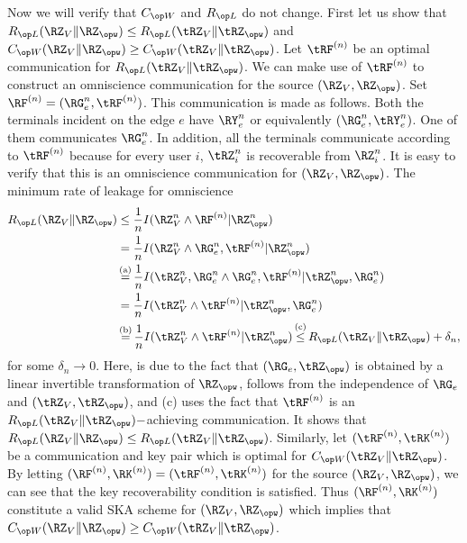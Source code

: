 Now we will verify that $\wskc$ and $\rl$ do not change.  First let us show that $\rl(\RZ_V\|\RZ_{\opw}) \leq \rl(\tRZ_V\|\tRZ_{\opw})$ and $\wskc(\RZ_V\| \RZ_{\opw}) \geq \wskc(\tRZ_V\|\tRZ_{\opw})$.
Let $\tRF^{(n)}$  be  an optimal communication  for $\rl(\tRZ_V\|\tRZ_{\opw})$. We can make use of $\tRF^{(n)}$ to construct an omniscience communication for the source $(\RZ_V,\RZ_{\opw})$. Set  $\RF^{(n)}= (\RG_e^n, \tRF^{(n)})$. This communication is made as follows. Both the terminals incident on the edge $e$  have $\RY_e^n$ or equivalently $(\RG_e^n, \tRY_e^n)$. One of them  communicates $\RG_e^n$. In addition, all the terminals communicate according to $\tRF^{(n)}$ because for every user $i$,  $\tRZ_i^n$ is recoverable from $\RZ_i^n$. It is easy to verify that this is an omniscience communication for $(\RZ_V,\RZ_{\opw})$.
The minimum rate of leakage for omniscience 
\begin{align*}
\rl(\RZ_V\|\RZ_{\opw})&\leq \frac{1}{n}I(\RZ_V^n\wedge  \RF^{(n)}|\RZ_{\opw}^n)\\ &= \frac{1}{n}I(\RZ_V^n\wedge  \RG_e^n, \tRF^{(n)}|\RZ_{\opw}^n)\\
&\utag{a}= \frac{1}{n}I(\tRZ_V^n,\RG_e^n\wedge  \RG_e^n, \tRF^{(n)}|\tRZ_{\opw}^n, \RG_e^n) \\ &= \frac{1}{n}I(\tRZ_V^n\wedge \tRF^{(n)}|\tRZ_{\opw}^n, \RG_e^n) \\
&\utag{b}= \frac{1}{n}I(\tRZ_V^n\wedge \tRF^{(n)}|\tRZ_{\opw}^n) \utag{c}\leq \rl(\tRZ_V\|\tRZ_{\opw}) + \delta_n,
\end{align*}
for some $\delta_n \to 0$. Here,  is due to the fact that $(\RG_e, \tRZ_{\opw})$ is obtained by a linear invertible transformation of $\RZ_{\opw}$,  follows from the independence of $\RG_e$ and $(\tRZ_V, \tRZ_{\opw})$, and (c) uses the fact that $\tRF^{(n)}$ is an $\rl(\tRZ_V\|\tRZ_{\opw})-$achieving communication. It shows that  $\rl(\RZ_V\|\RZ_{\opw}) \leq \rl(\tRZ_V\|\tRZ_{\opw})$. Similarly, let $(\tRF^{(n)},\tRK^{(n)})$ be a communication and key pair  which is optimal  for  $\wskc(\tRZ_V\|\tRZ_{\opw})$. By letting $(\RF^{(n)},\RK^{(n)})=( \tRF^{(n)}, \tRK^{(n)})$ for the source $(\RZ_V, \RZ_{\opw})$, we can see that the key recoverability condition is satisfied. Thus $(\RF^{(n)},\RK^{(n)})$ constitute a valid SKA scheme for $(\RZ_V, \RZ_{\opw})$ which implies that $\wskc(\RZ_V\| \RZ_{\opw}) \geq \wskc(\tRZ_V\|\tRZ_{\opw})$. 

